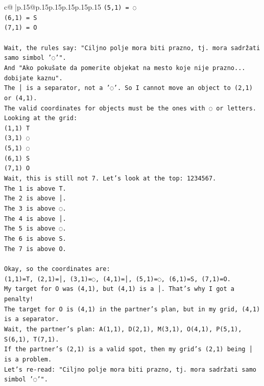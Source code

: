 \documentclass{article}
\begin{document}
{\begin{supertabular}{c@{$\;$}|p{.15\linewidth}@{}p{.15\linewidth}p{.15\linewidth}p{.15\linewidth}p{.15\linewidth}p{.15\linewidth}}
{{{\texttt{(5,1) = ◌} \\
\texttt{(6,1) = S} \\
\texttt{(7,1) = O} \\
\\ 
\texttt{Wait, the rules say: "Ciljno polje mora biti prazno, tj. mora sadržati samo simbol '◌'".} \\
\texttt{And "Ako pokušate da pomerite objekat na mesto koje nije prazno... dobijate kaznu".} \\
\texttt{The │ is a separator, not a '◌'. So I cannot move an object to (2,1) or (4,1).} \\
\texttt{The valid coordinates for objects must be the ones with ◌ or letters.} \\
\texttt{Looking at the grid:} \\
\texttt{(1,1) T} \\
\texttt{(3,1) ◌} \\
\texttt{(5,1) ◌} \\
\texttt{(6,1) S} \\
\texttt{(7,1) O} \\
\texttt{Wait, this is still not 7. Let's look at the top: 1234567.} \\
\texttt{The 1 is above T.} \\
\texttt{The 2 is above │.} \\
\texttt{The 3 is above ◌.} \\
\texttt{The 4 is above │.} \\
\texttt{The 5 is above ◌.} \\
\texttt{The 6 is above S.} \\
\texttt{The 7 is above O.} \\
\\ 
\texttt{Okay, so the coordinates are:} \\
\texttt{(1,1)=T, (2,1)=│, (3,1)=◌, (4,1)=│, (5,1)=◌, (6,1)=S, (7,1)=O.} \\
\texttt{My target for O was (4,1), but (4,1) is a │. That's why I got a penalty!} \\
\texttt{The target for O is (4,1) in the partner's plan, but in my grid, (4,1) is a separator.} \\
\texttt{Wait, the partner's plan: A(1,1), D(2,1), M(3,1), O(4,1), P(5,1), S(6,1), T(7,1).} \\
\texttt{If the partner's (2,1) is a valid spot, then my grid's (2,1) being │ is a problem.} \\
\texttt{Let's re{-}read: "Ciljno polje mora biti prazno, tj. mora sadržati samo simbol '◌'".} \\
}}}
\end{supertabular}}
\end{document}

